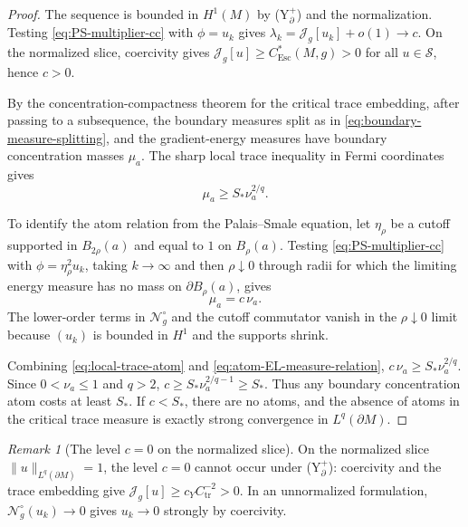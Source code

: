 \documentclass[11pt,reqno,a4paper]{amsart}
\numberwithin{equation}{section}
\theoremstyle{plain}
\newcommand{\Esc}{\ensuremath{\mathrm{Esc}}}
\theoremstyle{remark}
\newtheorem{remark}[theorem]{Remark}
\theoremstyle{plain}
\begin{document}
\begin{proof}
The sequence is bounded in $H^1(M)$ by \textup{(Y$^+_{\partial}$)} and the
normalization.  Testing \eqref{eq:PS-multiplier-cc} with $\phi=u_k$ gives
$\lambda_k=\mathcal J_g[u_k]+o(1)\to c$.
On the normalized slice, coercivity gives
$\mathcal J_g[u]\ge C^*_{\Esc}(M,g)>0$ for all $u\in\mathcal S$,
hence $c>0$.

By the concentration-compactness theorem for the critical trace embedding,
after passing to a subsequence, the boundary measures split as in
\eqref{eq:boundary-measure-splitting}, and the gradient-energy measures have
boundary concentration masses $\mu_a$.  The sharp local trace inequality in
Fermi coordinates gives
\begin{equation}\label{eq:local-trace-atom}
\mu_a\ge S_\ast\nu_a^{2/q}.
\end{equation}

To identify the atom relation from the Palais--Smale equation, let
$\eta_\rho$ be a cutoff supported in $B_{2\rho}(a)$ and equal to $1$ on
$B_\rho(a)$.  Testing \eqref{eq:PS-multiplier-cc} with
$\phi=\eta_\rho^2u_k$, taking $k\to\infty$ and then $\rho\downarrow0$
through radii for which the limiting energy measure has no mass on
$\partial B_\rho(a)$, gives
\begin{equation}\label{eq:atom-EL-measure-relation}
\mu_a=c\,\nu_a.
\end{equation}
The lower-order terms in $\mathcal N_g^\circ$ and the cutoff commutator
vanish in the $\rho\downarrow0$ limit because $(u_k)$ is bounded in $H^1$
and the supports shrink.

Combining \eqref{eq:local-trace-atom} and \eqref{eq:atom-EL-measure-relation},
$c\,\nu_a\ge S_\ast\nu_a^{2/q}$.
Since $0<\nu_a\le1$ and $q>2$,
$c\ge S_\ast\nu_a^{2/q-1}\ge S_\ast$.
Thus any boundary concentration atom costs at least $S_\ast$.  If
$c<S_\ast$, there are no atoms, and the absence of atoms in the critical
trace measure is exactly strong convergence in $L^q(\partial M)$.
\end{proof}

\begin{remark}[The level $c=0$ on the normalized slice]
\label{rem:PS-zero-level}
On the normalized slice $\|u\|_{L^q(\partial M)}=1$,
the level $c=0$ cannot occur under \textup{(Y$^+_{\partial}$)}: coercivity
and the trace embedding give
$\mathcal J_g[u]\ge c_Y C_{\mathrm{tr}}^{-2}>0$.
In an unnormalized formulation, $\mathcal N_g^\circ(u_k)\to0$ gives
$u_k\to0$ strongly by coercivity.
\end{remark}
\end{document}
